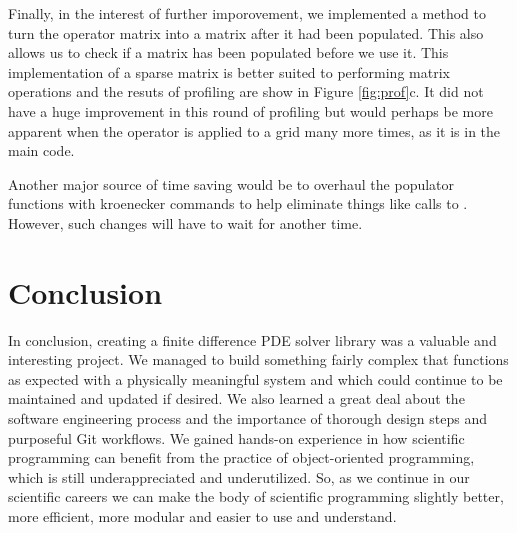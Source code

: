 \documentclass{article}
\begin{document}
	Finally, in the interest of further imporovement, we implemented a method to turn the operator matrix into a  matrix after it had been populated. This also allows us to check if a matrix has been populated before we use it. This implementation of a sparse matrix is better suited to performing matrix operations and the resuts of profiling are show in Figure \ref{fig:prof}c. It did not have a huge improvement in this round of profiling but would perhaps be more apparent when the operator is applied to a grid many more times, as it is in the main code. 

	Another major source of time saving would be to overhaul the populator functions with kroenecker commands to help eliminate things like calls to . However, such changes will have to wait for another time.

	\section{Conclusion}
	In conclusion, creating a finite difference PDE solver library was a valuable and interesting project. We managed to build something fairly complex that functions as expected with a physically meaningful system and which could continue to be maintained and updated if desired. We also learned a great deal about the software engineering process and the importance of thorough design steps and purposeful Git workflows. We gained hands-on experience in how scientific programming can benefit from the practice of object-oriented programming, which is still underappreciated and underutilized. So, as we continue in our scientific careers we can make the body of scientific programming slightly better, more efficient, more modular and easier to use and understand.

	\nocite{pycfd}
	\nocite{*}
	\printbibliography
\end{document}
